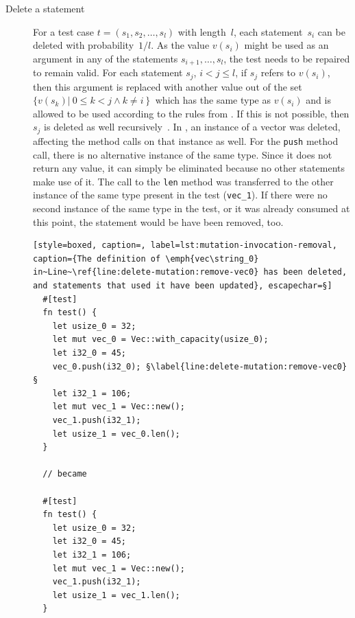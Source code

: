 \documentclass[paper=a4,%
  twoside,%
  BCOR4mm,%
  abstract=true,%
  toc=bibliography,%
  chapterprefix=true,%
  toc=bibliographynumbered,%
  open=right,%
  english,%
  pagesize=pdftex]{scrreprt}
\begin{document}
\begin{description}
  \item[Delete a statement] For a test case $t = (s_1, s_2, \dots, s_l)$ with length~$l$, each statement~$s_i$ can be deleted with probability~$1/l$. As the value $v(s_i)$ might be used as an argument in any of the statements $s_{i+1}, \dots, s_l$, the test needs to be repaired to remain valid. For each statement $s_j$, $i < j \leq l$, if $s_j$ refers to $v(s_i)$, then this argument is replaced with another value out of the set $\{v(s_k) \left|~0 \leq k < j \wedge k \neq i \right\}$ which has the same type as $v(s_i)$ and is allowed to be used according to the rules from . If this is not possible, then $s_j$ is deleted as well recursively~\cite{Fraser2012}. In , an instance of a vector was deleted, affecting the method calls on that instance as well. For the \texttt{push} method call, there is no alternative instance of the same type. Since it does not return any value, it can simply be eliminated because no other statements make use of it. The call to the \texttt{len} method was transferred to the other instance of the same type present in the test (\texttt{vec\string_1}). If there were no second instance of the same type in the test, or it was already consumed at this point, the statement would be have been removed, too.

  \begin{lstlisting}[style=boxed, caption=, label=lst:mutation-invocation-removal, caption={The definition of \emph{vec\string_0} in~Line~\ref{line:delete-mutation:remove-vec0} has been deleted, and statements that used it have been updated}, escapechar=§]
  #[test]
  fn test() {
    let usize_0 = 32;
    let mut vec_0 = Vec::with_capacity(usize_0);
    let i32_0 = 45;
    vec_0.push(i32_0); §\label{line:delete-mutation:remove-vec0}§
    let i32_1 = 106;
    let mut vec_1 = Vec::new();
    vec_1.push(i32_1);
    let usize_1 = vec_0.len();
  }

  // became

  #[test]
  fn test() {
    let usize_0 = 32;
    let i32_0 = 45;
    let i32_1 = 106;
    let mut vec_1 = Vec::new();
    vec_1.push(i32_1);
    let usize_1 = vec_1.len();
  }
  \end{lstlisting}

\end{description}
\end{document}

